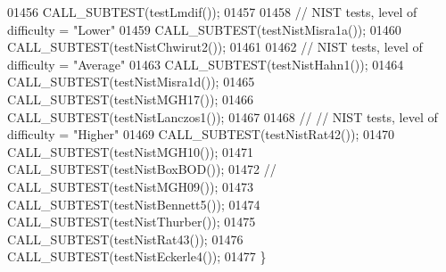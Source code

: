 \begin{DoxyCode}
01456     CALL\_SUBTEST(testLmdif());
01457 
01458     \textcolor{comment}{// NIST tests, level of difficulty = "Lower"}
01459     CALL\_SUBTEST(testNistMisra1a());
01460     CALL\_SUBTEST(testNistChwirut2());
01461 
01462     \textcolor{comment}{// NIST tests, level of difficulty = "Average"}
01463     CALL\_SUBTEST(testNistHahn1());
01464     CALL\_SUBTEST(testNistMisra1d());
01465     CALL\_SUBTEST(testNistMGH17());
01466     CALL\_SUBTEST(testNistLanczos1());
01467 
01468 \textcolor{comment}{//     // NIST tests, level of difficulty = "Higher"}
01469     CALL\_SUBTEST(testNistRat42());
01470     CALL\_SUBTEST(testNistMGH10());
01471     CALL\_SUBTEST(testNistBoxBOD());
01472 \textcolor{comment}{//     CALL\_SUBTEST(testNistMGH09());}
01473     CALL\_SUBTEST(testNistBennett5());
01474     CALL\_SUBTEST(testNistThurber());
01475     CALL\_SUBTEST(testNistRat43());
01476     CALL\_SUBTEST(testNistEckerle4());
01477 \}
\end{DoxyCode}
